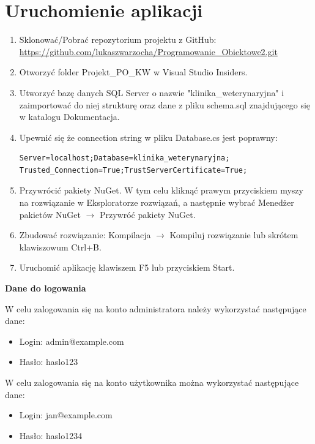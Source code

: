 \section{Uruchomienie aplikacji}

\begin{enumerate}
\item Sklonować/Pobrać repozytorium projektu z GitHub: 
\url{https://github.com/lukaszwarzocha/Programowanie_Obiektowe2.git}
\item Otworzyć folder Projekt\_PO\_KW w Visual Studio Insiders.
\item Utworzyć bazę danych SQL Server o nazwie "klinika\_weterynaryjna" i zaimportować do niej strukturę 
oraz dane z pliku schema.sql znajdującego się w katalogu Dokumentacja.
\item Upewnić się że connection string w pliku Database.cs jest poprawny:
\begin{lstlisting}
Server=localhost;Database=klinika_weterynaryjna;
Trusted_Connection=True;TrustServerCertificate=True;
\end{lstlisting}
\item Przywrócić pakiety NuGet. W tym celu kliknąć prawym przyciskiem myszy na rozwiązanie w Eksploratorze rozwiązań, a następnie wybrać 
Menedżer pakietów NuGet $\rightarrow$ Przywróć pakiety NuGet.
\item Zbudować rozwiązanie: Kompilacja $\rightarrow$ Kompiluj rozwiązanie lub skrótem klawiszowum Ctrl+B.
\item Uruchomić aplikację klawiszem F5 lub przyciskiem Start.
\end{enumerate}

\textbf{Dane do logowania}

W celu zalogowania się na konto administratora należy wykorzystać następujące dane:
\begin{itemize}
\item Login: admin@example.com
\item Hasło: haslo123
\end{itemize}

W celu zalogowania się na konto użytkownika można wykorzystać następujące dane:
\begin{itemize}
\item Login: jan@example.com
\item Hasło: haslo1234
\end{itemize}





